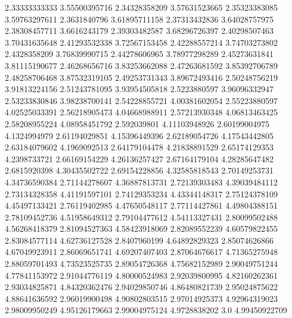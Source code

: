   2.33333333333    3.55500395716
  2.34328358209    3.57631523665
  2.35323383085    3.59763297611
   2.3631840796    3.61895711158
  2.37313432836    3.64028757975
  2.38308457711     3.6616243179
  2.39303482587    3.68296726397
  2.40298507463    3.70431635648
  2.41293532338    3.72567153458
  2.42288557214    3.74703273802
   2.4328358209    3.76839990715
  2.44278606965    3.78977298289
  2.45273631841    3.81115190677
  2.46268656716    3.83253662088
  2.47263681592    3.85392706789
  2.48258706468    3.87532319105
  2.49253731343    3.89672493416
  2.50248756219    3.91813224156
  2.51243781095    3.93954505818
   2.5223880597    3.96096332947
  2.53233830846    3.98238700141
  2.54228855721    4.00381602054
  2.55223880597    4.02525033391
  2.56218905473    4.04668988911
  2.57213930348    4.06813463425
  2.58208955224    4.08958451792
    2.592039801    4.11103948926
  2.60199004975     4.1324994979
  2.61194029851    4.15396449396
  2.62189054726    4.17543442805
  2.63184079602     4.1969092513
  2.64179104478    4.21838891529
  2.65174129353     4.2398733721
  2.66169154229    4.26136257427
  2.67164179104    4.28285647482
   2.6815920398    4.30435502722
  2.69154228856    4.32585818543
  2.70149253731    4.34736590384
  2.71144278607    4.36887813731
  2.72139303483    4.39039484112
  2.73134328358    4.41191597101
  2.74129353234    4.43344148317
  2.75124378109    4.45497133421
  2.76119402985    4.47650548117
  2.77114427861    4.49804388151
  2.78109452736    4.51958649312
  2.79104477612    4.54113327431
  2.80099502488    4.56268418379
  2.81094527363    4.58423918069
  2.82089552239    4.60579822455
  2.83084577114    4.62736127528
   2.8407960199    4.64892829323
  2.85074626866    4.67049923911
  2.86069651741    4.69207407403
  2.87064676617    4.71365275948
  2.88059701493    4.73523525735
  2.89054726368    4.75682152989
  2.90049751244    4.77841153972
  2.91044776119    4.80000524983
  2.92039800995    4.82160262361
  2.93034825871    4.84320362476
  2.94029850746    4.86480821739
  2.95024875622    4.88641636592
  2.96019900498    4.90802803515
  2.97014925373    4.92964319023
  2.98009950249    4.95126179663
  2.99004975124     4.9728838202
            3.0    4.99450922709
